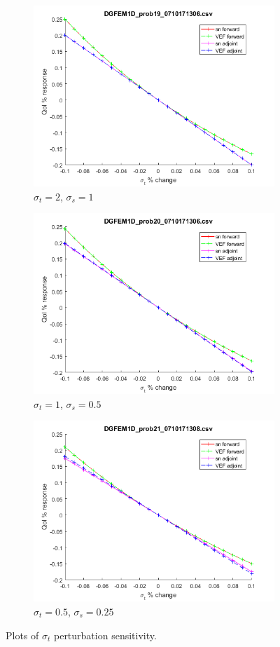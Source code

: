 \documentclass{article}
\newcommand{\sigt}{\sigma_t}
\newcommand{\sigs}{\sigma_s}
\begin{document}
\begin{figure}[H]
\label{HomoPertt}
\centering
\begin{subfigure}{.5\textwidth}
  \centering
  \includegraphics[width=.8\linewidth]{figures/19sigtSens.png}
  \caption{$\sigt=2$, $\sigs=1$}
  \label{fig:sfig1}
\end{subfigure}%
\begin{subfigure}{.5\textwidth}
  \centering
  \includegraphics[width=.8\linewidth]{figures/20sigtSens.png}
  \caption{$\sigt=1$, $\sigs=0.5$}
  \label{fig:sfig2}
\end{subfigure}
\begin{subfigure}{.5\textwidth}
  \centering
  \includegraphics[width=.8\linewidth]{figures/21sigtSens.png}
  \caption{$\sigt=0.5$, $\sigs=0.25$}
  \label{fig:sfig3}
\end{subfigure}
\caption{Plots of $\sigt$ perturbation sensitivity.}
\label{fig:fig}
\end{figure}
\end{document}
